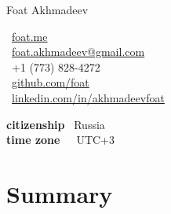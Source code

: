 \documentclass[10pt, a4paper]{article}
\makeatletter
\def\myauthor{Foat Akhmadeev}
\def\myphone{+1 (773) 828-4272}
\def\myemail{foat.akhmadeev@gmail.com}
\def\mygithub{github.com/foat}
\def\mylinkedin{linkedin.com/in/akhmadeevfoat}
\def\myhomesite{foat.me}
\def\mycitizenship{Russia}
\def\mytimezone{UTC+3}
\makeatother
\begin{document}
{\LARGE \myauthor}\\[1cm]
\begin{minipage}[t]{2in}
\end{minipage}
\begin{minipage}[t]{2in}
\flushleft
\faHome \, \href{http://\myhomesite}{\myhomesite}\\
\faEnvelope \, \href{mailto:\myemail}{\myemail}\\
\faPhone \, \myphone\\
\faGithub \, \href{https://\mygithub}{\mygithub}\\
\faLinkedin \, \href{https://\mylinkedin}{\mylinkedin}\\
\end{minipage}
\begin{minipage}[t]{3in}
\flushleft
\textbf{citizenship} \, \mycitizenship\\
\textbf{time zone}\, \, \, \mytimezone\\
\end{minipage}

\section*{Summary}
\end{document}
